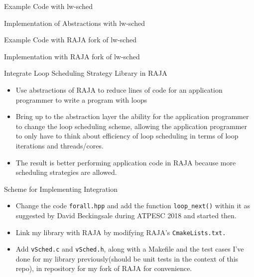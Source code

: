 \documentclass{beamer}
\begin{document}
\begin{frame}{Example Code with lw-sched}
\begin{figure}[ht!] 

\end{figure}
\end{frame}

\begin{frame}{Implementation of Abstractions with lw-sched}
\begin{figure}[ht!] 

\end{figure}
\end{frame}




\begin{frame}{Example Code with RAJA fork of lw-sched}
\begin{figure}[ht!] 

\end{figure}
\end{frame}



\begin{frame}{Implementation with RAJA fork of lw-sched}
\begin{figure}[ht!] 

\end{figure}
\end{frame}





\begin{frame}{Integrate Loop Scheduling Strategy Library in RAJA}
\begin{itemize}
\item Use abstractions of RAJA to reduce lines of code for an application programmer to write a program with loops 
\item Bring up to the abstraction layer the ability for the application programmer to change the loop scheduling scheme, allowing the application programmer to only have to think about efficiency of loop scheduling in terms of loop iterations and threads/cores.  
\item The result is better performing application code in RAJA because more scheduling strategies are allowed. 
\end{itemize} 
\end{frame}

\begin{frame}{Scheme for Implementing Integration}
\begin{itemize}
\item Change the code {\tt forall.hpp} and add the function {\tt loop\_next()} within it as suggested by David Beckingsale during ATPESC 2018 and started then.
\item Link my library with RAJA by modifying RAJA's {\tt CmakeLists.txt.}
\item Add {\tt vSched.c} and {\tt vSched.h}, along with a Makefile and the test cases I've done for my library previously(should be unit tests in the context of this repo), in repository for my fork of RAJA for convenience.
\end{itemize}
\end{frame}
\end{document}
